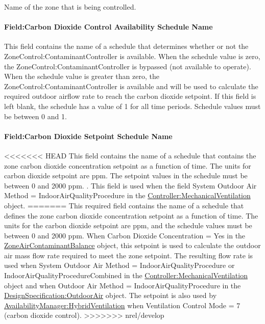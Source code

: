 Name of the zone that is being controlled.

\paragraph{Field:Carbon Dioxide Control Availability Schedule Name}\label{fieldcarbon-dioxide-control-availability-schedule-name}

This field contains the name of a schedule that determines whether or not the ZoneControl:ContaminantController is available. When the schedule value is zero, the ZoneControl:ContaminantController is bypassed (not available to operate). When the schedule value is greater than zero, the ZoneControl:ContaminantController is available and will be used to calculate the required outdoor airflow rate to reach the carbon dioxide setpoint. If this field is left blank, the schedule has a value of 1 for all time periods. Schedule values must be between 0 and 1.

\paragraph{Field:Carbon Dioxide Setpoint Schedule Name}\label{fieldcarbon-dioxide-setpoint-schedule-name}

<<<<<<< HEAD
This field contains the name of a schedule that contains the zone carbon dioxide concentration setpoint as a function of time. The units for carbon dioxide setpoint are ppm. The setpoint values in the schedule must be between 0 and 2000 ppm. . This field is used when the field System Outdoor Air Method = IndoorAirQualityProcedure in the \hyperref[controllermechanicalventilation]{Controller:MechanicalVentilation} object.
=======
This required field contains the name of a schedule that defines the zone carbon dioxide concentration setpoint as a function of time. The units for the carbon dioxide setpoint are ppm, and the schedule values must be between 0 and 2000 ppm. When Carbon Dioxide Concentration = Yes in the \hyperref[zoneaircontaminantbalance]{ZoneAirContaminantBalance} object, this setpoint is used to calculate the outdoor air mass flow rate required to meet the zone setpoint. The resulting flow rate is used when System Outdoor Air Method = IndoorAirQualityProcedure or IndoorAirQualityProcedureCombined in the \hyperref[controllermechanicalventilation]{Controller:MechanicalVentilation} object and when Outdoor Air Method = IndoorAirQualityProcedure in the \hyperref[designspecificationoutdoorair]{DesignSpecification:OutdoorAir} object. The setpoint is also used by \hyperref[availabilitymanagerhybridventilation]{AvailabilityManager:HybridVentilation} when Ventilation Control Mode = 7 (carbon dioxide control).
>>>>>>> nrel/develop

